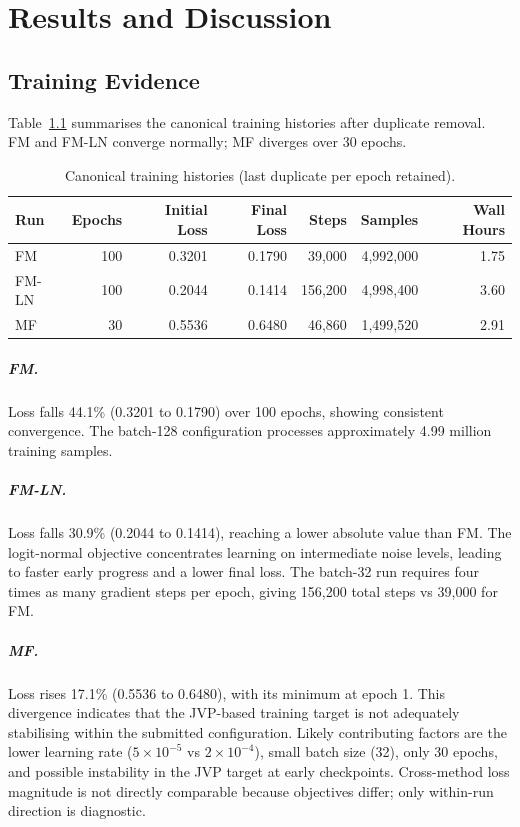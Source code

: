 ﻿\chapter{Results and Discussion}

\section{Training Evidence}

Table~\ref{tab:train} summarises the canonical training histories after duplicate
removal. FM and FM-LN converge normally; MF diverges over 30 epochs.

\begin{table}[htbp]\centering
\caption{Canonical training histories (last duplicate per epoch retained).}\label{tab:train}
\begin{tabular}{lrrrrrr}\toprule
Run & Epochs & Initial Loss & Final Loss & Steps & Samples & Wall Hours\\\midrule
FM                & 100 & 0.3201 & 0.1790 & 39{,}000 & 4{,}992{,}000 & 1.75\\
FM-LN & 100 & 0.2044 & 0.1414 & 156{,}200 & 4{,}998{,}400 & 3.60\\
MF    &  30 & 0.5536 & 0.6480 &  46{,}860 & 1{,}499{,}520 & 2.91\\\bottomrule
\end{tabular}\end{table}

\paragraph{FM.}
Loss falls 44.1\% (0.3201 to 0.1790) over 100 epochs, showing consistent
convergence. The batch-128 configuration processes approximately 4.99 million
training samples.

\paragraph{FM-LN.}
Loss falls 30.9\% (0.2044 to 0.1414), reaching a lower absolute value than FM.
The logit-normal objective concentrates learning on intermediate noise levels,
leading to faster early progress and a lower final loss. The batch-32 run requires
four times as many gradient steps per epoch, giving 156{,}200 total steps vs
39{,}000 for FM.

\paragraph{MF.}
Loss rises 17.1\% (0.5536 to 0.6480), with its minimum at epoch 1. This
divergence indicates that the JVP-based training target is not adequately
stabilising within the submitted configuration. Likely contributing factors are
the lower learning rate ($5\!\times\!10^{-5}$ vs $2\!\times\!10^{-4}$), small
batch size (32), only 30 epochs, and possible instability in the JVP target at
early checkpoints. Cross-method loss magnitude is not directly comparable
because objectives differ; only within-run direction is diagnostic.

